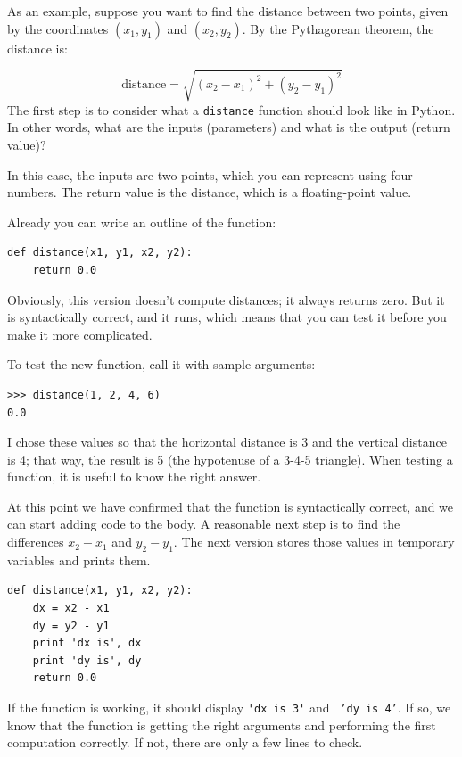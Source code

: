 \documentclass[10pt]{book}
\begin{document}

As an example, suppose you want to find the distance between two
points, given by the coordinates $(x_1, y_1)$ and $(x_2, y_2)$.
By the Pythagorean theorem, the distance is:

\begin{displaymath}
\mathrm{distance} = \sqrt{(x_2 - x_1)^2 + (y_2 - y_1)^2}
\end{displaymath}
%
The first step is to consider what a {\tt distance} function should
look like in Python.  In other words, what are the inputs (parameters)
and what is the output (return value)?

In this case, the inputs are two points, which you can represent
using four numbers.  The return value is the distance, which is
a floating-point value.

Already you can write an outline of the function:

\beforeverb
\begin{verbatim}
def distance(x1, y1, x2, y2):
    return 0.0
\end{verbatim}
\afterverb
%
Obviously, this version doesn't compute distances; it always returns
zero.  But it is syntactically correct, and it runs, which means that
you can test it before you make it more complicated.

To test the new function, call it with sample arguments:

\beforeverb
\begin{verbatim}
>>> distance(1, 2, 4, 6)
0.0
\end{verbatim}
\afterverb
%
I chose these values so that the horizontal distance is 3 and the
vertical distance is 4; that way, the result is 5
(the hypotenuse of a 3-4-5 triangle). When testing a function, it is
useful to know the right answer.


At this point we have confirmed that the function is syntactically
correct, and we can start adding code to the body.
A reasonable next step is to find the differences
$x_2 - x_1$ and $y_2 - y_1$.  The next version stores those values in
temporary variables and prints them.

\beforeverb
\begin{verbatim}
def distance(x1, y1, x2, y2):
    dx = x2 - x1
    dy = y2 - y1
    print 'dx is', dx
    print 'dy is', dy
    return 0.0
\end{verbatim}
\afterverb
%
If the function is working, it should display \verb"'dx is 3'" and {\tt
'dy is 4'}.  If so, we know that the function is getting the right
arguments and performing the first computation correctly.  If not,
there are only a few lines to check.
\end{document}

